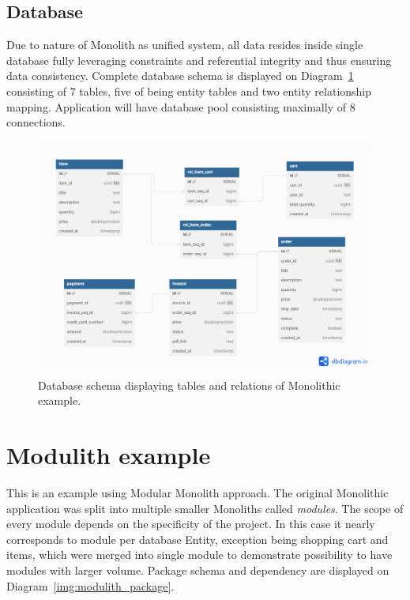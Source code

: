 \subsection{Database}
Due to nature of Monolith as unified system, all data resides inside single database fully leveraging constraints and referential integrity and thus ensuring data consistency. Complete database schema is displayed on Diagram~\ref{img:monolith_db_schema} consisting of 7 tables, five of being entity tables and two entity relationship mapping. Application will have database pool consisting maximally of 8 connections.

\begin{figure}
    \centering
    \includegraphics[width=\textwidth]{images/monolith_db_schema.png}
    \caption{Database schema displaying tables and relations of Monolithic example. \label{img:monolith_db_schema}}
\end{figure}



\section{Modulith example}
This is an example using Modular Monolith approach. The original Monolithic application was split into multiple smaller Monoliths called \textit{modules}. The scope of every module depends on the specificity of the project. In this case it nearly corresponds to module per database Entity, exception being shopping cart and items, which were merged into single module to demonstrate possibility to have modules with larger volume. Package schema and dependency are displayed on Diagram~\ref{img:modulith_package}.

